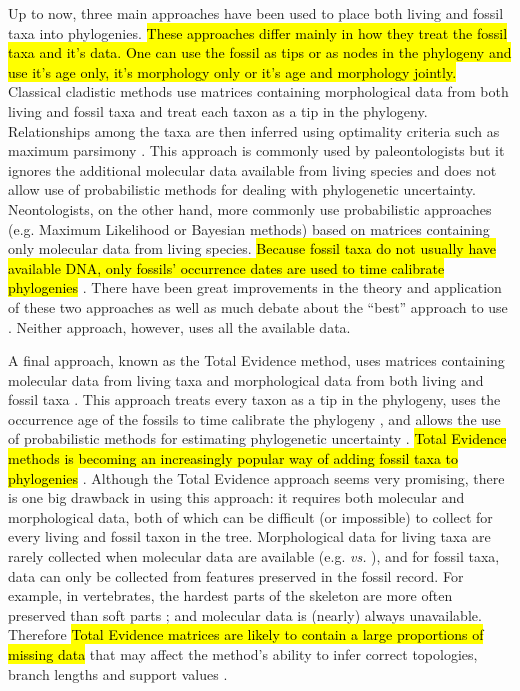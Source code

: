 \documentclass[12pt,letterpaper]{article}
\begin{document}
Up to now, three main approaches have been used to place both living and fossil taxa into phylogenies.
\hl{These approaches differ mainly in how they treat the fossil taxa and it's data.
One can use the fossil as tips or as nodes in the phylogeny and use it's age only, it's morphology only or it's age and morphology jointly.}
Classical cladistic methods use matrices containing morphological data from both living and fossil taxa and treat each taxon as a tip in the phylogeny. Relationships among the taxa are then inferred using optimality criteria such as maximum parsimony \citep{Hennig1966,felsenstein2004}.
This approach is commonly used by paleontologists but it ignores the additional molecular data available from living species and does not allow use of probabilistic methods for dealing with phylogenetic uncertainty.
Neontologists, on the other hand, more commonly use probabilistic approaches (e.g. Maximum Likelihood or Bayesian methods) based on matrices containing only molecular data from living species.
\hl{Because fossil taxa do not usually have available DNA, only fossils' occurrence dates are used to time calibrate phylogenies} \citep{zuckerkandl1965}.
There have been great improvements in the theory and application of these two approaches \citep[e.g.][]{bapsta2013,stadlerdating2013,heaththe2013} as well as much debate about the ``best'' approach to use \citep[e.g.][]{spencerefficacy2013,wrightbayesian2014}.
Neither approach, however, uses all the available data.

A final approach, known as the Total Evidence method, uses matrices containing molecular data from living taxa and morphological data from both living and fossil taxa \citep{eernissetaxonomic1993}.
This approach treats every taxon as a tip in the phylogeny, uses the occurrence age of the fossils to time calibrate the phylogeny \citep[known as tip-dating;][]{ronquista2012}, and allows the use of probabilistic methods for estimating phylogenetic uncertainty \citep{ronquista2012}.
\hl{Total Evidence methods is becoming an increasingly popular way of adding fossil taxa to phylogenies} \citep[e.g.][]{pyrondivergence2011,ronquista2012,schragocombining2013,slaterphylogenetic2013,beckancient2014,Arcila2015131}.
Although the Total Evidence approach seems very promising, there is one big drawback in using this approach: it requires both molecular and morphological data, both of which can be difficult (or impossible) to collect for every living and fossil taxon in the tree.
Morphological data for living taxa are rarely collected when molecular data are available (e.g. \citealp{O'Leary08022013} \textit{vs.} \citealp{meredithimpacts2011}), and for fossil taxa, data can only be collected from features preserved in the fossil record.
For example, in vertebrates, the hardest parts of the skeleton are more often preserved than soft parts \citep{sansomfossilization2013}; and molecular data is (nearly) always unavailable.
Therefore \hl{Total Evidence matrices are likely to contain a large proportions of missing data} that may affect the method's ability to infer correct topologies, branch lengths and support values \citep{salamin2003}. 
\end{document}
